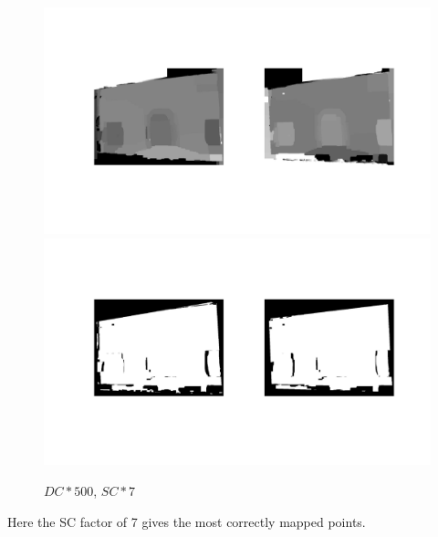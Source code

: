 \documentclass[12pt]{article}
\begin{document}
\begin{figure}[H]
	\centering
	\includegraphics[width=1.1\textwidth]{gc_500_7_1.jpg}
	\includegraphics[width=1.1\textwidth]{gc_500_7_2.jpg}
	\caption{$DC*500$, $SC*7$}
	\label{fig1}
\end{figure}
Here the SC factor of 7 gives the most correctly mapped points. 
\end{document}

